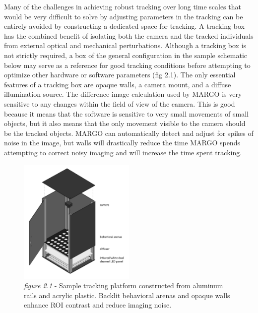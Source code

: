\documentclass[11pt]{article}
\begin{document}
Many of the challenges in achieving robust tracking over long time scales that would be very difficult to solve by adjusting parameters in the tracking can be entirely avoided by constructing a dedicated space for tracking. A tracking box has the combined benefit of isolating both the camera and the tracked individuals from external optical and mechanical perturbations. Although a tracking box is not strictly required, a box of the general configuration in the sample schematic below may serve as a reference for good tracking conditions before attempting to optimize other hardware or software parameters (fig 2.1). The only essential features of a tracking box are opaque walls, a camera mount, and a  diffuse illumination source. The difference image calculation used by MARGO is very sensitive to any changes within the field of view of the camera. This is good because it means that the software is sensitive to very small movements of small objects, but it also means that the only movement visible to the camera should be the tracked objects. MARGO can automatically detect and adjust for spikes of noise in the image, but walls will drastically reduce the time MARGO spends attempting to correct noisy imaging and will increase the time spent tracking.

\begin{figure}[h!]
	\begin{center}
		\includegraphics[width=0.5\textwidth]{images/Hardware Setup/Tracking box/behavioral_box_isometric_painted_labels.pdf}
		\caption*{\footnotesize {\textit{figure 2.1} - Sample tracking platform constructed from aluminum rails and acrylic plastic. Backlit behavioral arenas and opaque walls enhance ROI contrast and reduce imaging noise.}}
	\end{center}
\end{figure}
\end{document}
